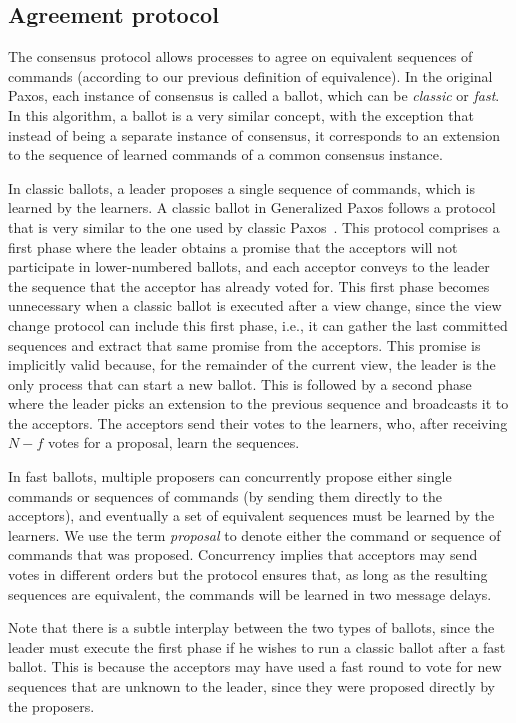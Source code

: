 \subsection{Agreement protocol} 

The consensus protocol allows processes to agree on equivalent sequences of commands (according to our previous definition of equivalence). In the original Paxos, each instance of consensus is called a ballot, which can be \textit{classic} or \textit{fast}. In this algorithm, a ballot is a very similar concept, with the exception that instead of being a separate instance of consensus, it corresponds to an extension to the sequence of learned commands of a common consensus instance.

In classic ballots, a leader proposes a single sequence of commands, which is learned by the learners. 
A classic ballot in Generalized Paxos follows a protocol that is very similar to the one used by classic Paxos~\cite{Lam98}. This protocol comprises a first phase where the leader obtains a promise that the acceptors will not participate in lower-numbered ballots, and each acceptor conveys to the leader the sequence that the acceptor has already voted for. This first phase becomes unnecessary when a classic ballot is executed after a view change, since the view change protocol can include this first phase, i.e., it can gather the last committed sequences and extract that same promise from the acceptors. This promise is implicitly valid because, for the remainder of the current view, the leader is the only process that can start a new ballot. This is followed by a second phase where the leader picks an extension to the previous sequence and broadcasts it to the acceptors. The acceptors send their votes to the learners, who, after receiving $N-f$ votes for a proposal, learn the sequences. 

In fast ballots, multiple proposers can concurrently propose either single commands or sequences of commands (by sending them directly to the acceptors), and eventually a set of equivalent sequences must be learned by the learners. We use the term \textit{proposal} to denote either the command or sequence of commands that was proposed.
Concurrency implies that acceptors may send votes in different orders but the protocol ensures that, as long as the resulting sequences are equivalent, the commands will be learned in two message delays. 

 Note that there is a subtle interplay between the two types of ballots, since the leader must execute the first phase if he wishes to run a classic ballot after a fast ballot. This is because the acceptors may have used a fast round to vote for new sequences that are unknown to the leader, since they were proposed directly by the proposers.

